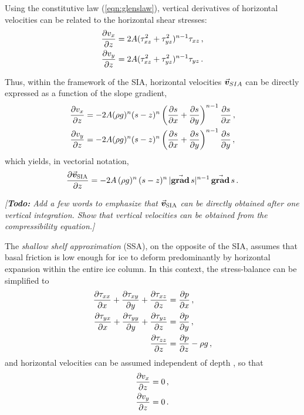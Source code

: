 \documentclass{article}
\newcommand{\todo}[1]{\emph{[\textbf{Todo:} #1]}}
\newcommand{\vect}[1]{\va*{#1}} %
\renewcommand{\grad}[1]{\vect{\mathrm{grad}}\,#1}   %
\newcommand{\vv}[0]{\vect{v}}           %
\newcommand{\vsia}[0]{\vv_{\mathrm{SIA}}}   %
\begin{document}
Using the constitutive law (\ref{eqn:glenslaw}), vertical derivatives of
horizontal velocities can be related to the horizontal shear stresses:
\begin{subequations}
\begin{align}
    \pdv{v_x}{z} &= 2A (\tau_{xz}^2 + \tau_{yz}^2)^{n-1} \tau_{xz} \,, \\
    \pdv{v_y}{z} &= 2A (\tau_{xz}^2 + \tau_{yz}^2)^{n-1} \tau_{yz} \,.
\end{align}
\end{subequations}

Thus, within the framework of the SIA, horizontal velocities $\vv_{SIA}$ can be
directly expressed as a function of the slope gradient,
\begin{subequations}
\begin{align}
    \pdv{v_x}{z} &= -2A (\rho g)^n (s-z)^n
                    \left(\pdv{s}{x}+\pdv{s}{y}\right)^{n-1} \pdv{s}{x} \,, \\
    \pdv{v_y}{z} &= -2A (\rho g)^n (s-z)^n
                    \left(\pdv{s}{x}+\pdv{s}{y}\right)^{n-1} \pdv{s}{y} \,,
\end{align}
\end{subequations}
which yields, in vectorial notation,
\begin{equation}
    \label{eqn:vsia}
    \pdv{\vsia}{z} = -2A\,(\rho g)^n\,(s-z)^n\,|\grad{s}|^{n-1}\,\grad{s} \,.
\end{equation}

\todo{Add a few words to emphasize that $\vsia$ can be directly obtained
      after one vertical integration. Show that vertical velocities can be
      obtained from the compressibility equation.}

The \emph{shallow shelf approximation} (SSA), on the opposite of the SIA,
assumes that
basal friction is low enough for ice to deform predominantly by horizontal
expansion within the entire ice column. In this context, the stress-balance can
be simplified to \citep[Eqs.~4.10--4.12]{Weis.etal.1999}
\begin{subequations}
\label{eqn:ssa}
\begin{align}
    \label{eqn:ssax}
    \pdv{\tau_{xx}}{x} + \pdv{\tau_{xy}}{y} + \pdv{\tau_{xz}}{z}
        &= \pdv{p}{x} \,, \\
    \label{eqn:ssay}
    \pdv{\tau_{yx}}{x} + \pdv{\tau_{yy}}{y} + \pdv{\tau_{yz}}{z}
        &= \pdv{p}{y} \,, \\
    \label{eqn:ssaz}
    \pdv{\tau_{zz}}{z} &= \pdv{p}{z} - \rho g \,,
\end{align}
\end{subequations}
and horizontal velocities can be assumed independent of depth
\citep[Eq.~4.22]{Weis.etal.1999}, so that
\begin{align}
    \pdv{v_x}{z} &= 0 \,, \\
    \pdv{v_y}{z} &= 0 \,.
\end{align}
\end{document}
